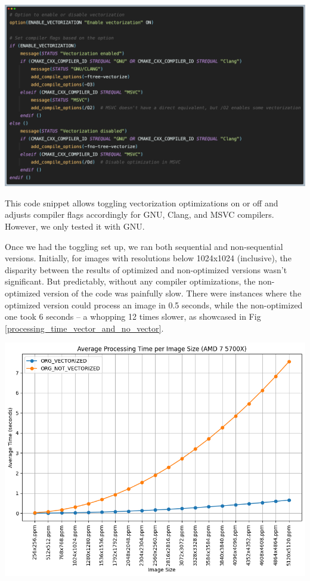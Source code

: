 \documentclass[sigconf]{acmart}
\begin{document}
\begin{center}
    \includegraphics[width=0.8\linewidth]{vizs/vectorization_code.png}
    \label{vectorization_toggle}
\end{center}

This code snippet allows toggling vectorization optimizations on or off and adjusts compiler flags accordingly for GNU, Clang, and MSVC compilers. However, we only tested it with GNU.


Once we had the toggling set up, we ran both sequential and non-sequential versions. Initially, for images with resolutions below 1024x1024 (inclusive), the disparity between the results of optimized and non-optimized versions wasn't significant. But predictably, without any compiler optimizations, the non-optimized version of the code was painfully slow. There were instances where the optimized version could process an image in 0.5 seconds, while the non-optimized one took 6 seconds – a whopping 12 times slower, as showcased in Fig \ref{processing_time_vector_and_no_vector}.

\begin{center}
    \includegraphics[width=0.8\linewidth]{vizs/amd_output_org.png}
    \label{processing_time_vector_and_no_vector}
\end{center}
\end{document}
